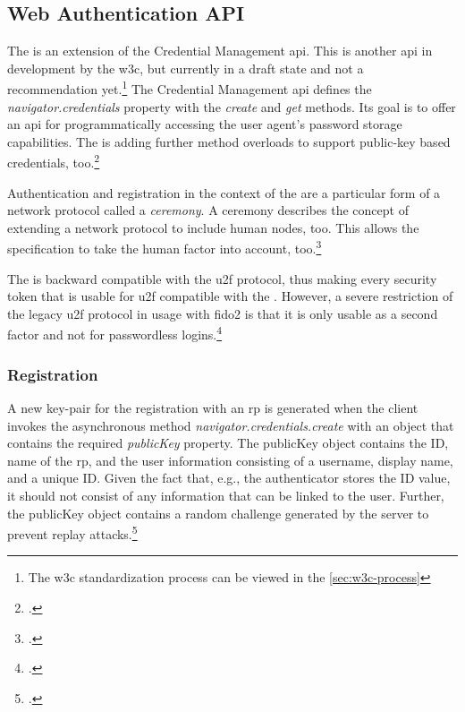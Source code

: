 \subsection{Web Authentication API}
\label{subsec:wa}

The \wa{} is an extension of the Credential Management \gls{api}. This is another \gls{api} in development by the \gls{w3c}, but currently in a draft state and not a recommendation yet.\footnote{The \gls{w3c} standardization process can be viewed in the \autoref{sec:w3c-process}} The Credential Management \gls{api} defines the \textit{navigator.credentials} property with the \textit{create} and \textit{get} methods. Its goal is to offer an \gls{api} for programmatically accessing the user agent's password storage capabilities. The \wa{} is adding further method overloads to support public-key based credentials, too.\footcites[See][Chapter 1]{w3c}[See][Chapter 1.1]{w3c-credentials}

Authentication and registration in the context of the \wa{} are a particular form of a network protocol called a \textit{ceremony}. A ceremony describes the concept of extending a network protocol to include human nodes, too. This allows the specification to take the human factor into account, too.\footcite[See][2]{Ellison2007CeremonyDA}

The \wa{} is backward compatible with the \gls{u2f} protocol, thus making every security token that is usable for \gls{u2f} compatible with the \wa. However, a severe restriction of the legacy \gls{u2f} protocol in usage with \gls{fido}2 is that it is only usable as a second factor and not for passwordless logins.\footcites[See][Chapter 2.2.1, 6.1.2]{w3c}

\subsubsection{Registration}

A new key-pair for the registration with an \gls{rp} is generated when the client invokes the asynchronous method \textit{navigator.credentials.create} with an object that contains the required \textit{publicKey} property. The publicKey object contains the ID, name of the \gls{rp}, and the user information consisting of a username, display name, and a unique ID. Given the fact that, e.g., the authenticator stores the ID value, it should not consist of any information that can be linked to the user. Further, the publicKey object contains a random challenge generated by the server to prevent replay attacks.\footcites[See][Chapter 5.1.3]{w3c}

